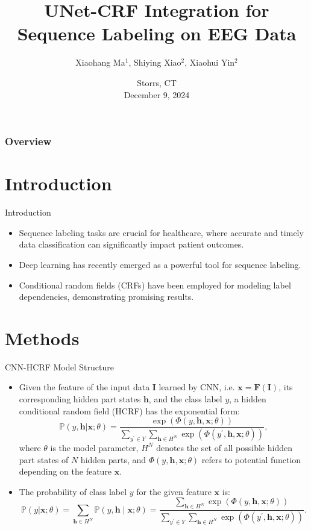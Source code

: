 \documentclass[leqno]{beamer}
\title[\textcolor{black}{UNet-CRF\_EEG}]{\large
UNet-CRF Integration for Sequence Labeling on EEG Data}
\author[\scalebox{.85}{Xiaohang Ma, Shiying Xiao, Xiaohui Yin}]
{Xiaohang Ma$^1$, Shiying Xiao$^2$, Xiaohui Yin$^2$}
\institute[\scalebox{.85}{UConn}]
{$^1$Department of Mathematics, University of Connecticut \\
$^2$Department of Statistics, University of Connecticut}
\date[December 9, 2024]{
{\small Storrs, CT} \\
{\small December 9, 2024}}
\newcommand{\PP}{{\mathbb{P}}}
\newcommand{\Fb}{\mathbf{F}}
\newcommand{\Ib}{\mathbf{I}}
\newcommand{\hb}{\mathbf{h}}
\newcommand{\xb}{\mathbf{x}}
\begin{document}
\begin{frame}[plain]
\titlepage
\end{frame}


\begin{frame}
\frametitle{Overview}
\tableofcontents
\end{frame}


\section[Introduction]{Introduction}


\begin{frame}{Introduction}
\begin{itemize}
\setlength{\itemsep}{1.5em}
\item Sequence labeling tasks are crucial for healthcare, where accurate and
timely data classification can significantly impact patient outcomes.
\item Deep learning has recently emerged as a powerful tool for sequence
labeling.
\item Conditional random fields (CRFs) have been employed for modeling label
dependencies, demonstrating promising results.
\end{itemize}
\end{frame}


\section[Methods]{Methods}


\begin{frame}{CNN-HCRF Model Structure}
\begin{itemize}
\item Given the feature of the input data $\Ib$ learned by CNN, i.e.
$\xb = \Fb(\Ib)$, its corresponding hidden part states $\hb$, and the class
label $y$, a hidden conditional random field (HCRF) has the exponential form:
\begin{equation*}
\PP(y, \hb \vert \xb; \theta)
= \frac{\exp\left(\Phi(y, \hb, \xb; \theta)\right)}
{\sum_{y^\prime \in Y} \sum_{\hb \in H^N}
\exp\left(\Phi(y^\prime, \hb, \xb; \theta)\right)},
\end{equation*}
where $\theta$ is the model parameter, $H^N$ denotes the set of all possible
hidden part states of $N$ hidden parts, and $\Phi(y, \hb, \xb; \theta)$
refers to potential function depending on the feature $\xb$.
\item The probability of class label $y$ for the given feature $\xb$ is:
\begin{equation*}
\PP(y \vert \xb; \theta) = \sum_{\hb \in H^N} \PP(y, \hb \mid \xb; \theta)
= \frac{\sum_{\hb \in H^N} \exp\left(\Phi(y, \hb, \xb; \theta)\right)}
{\sum_{y^\prime \in Y} \sum_{\hb \in H^N}
\exp\left(\Phi(y^\prime, \hb, \xb; \theta)\right)}.
\end{equation*}
\end{itemize}
\end{frame}
\end{document}
